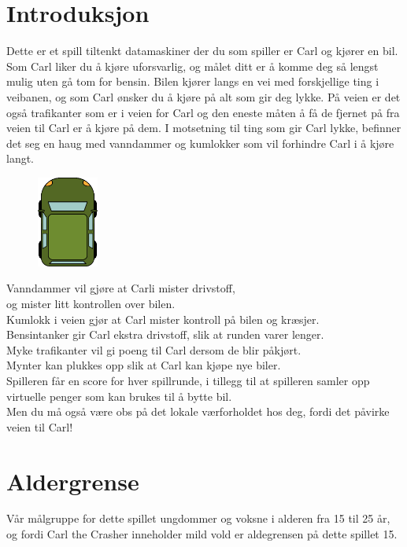 \documentclass[paper=a4]{article}
\begin{document}
\section{Introduksjon}
Dette er et spill tiltenkt datamaskiner der du som spiller er Carl og kjører en bil. 
Som Carl liker du å kjøre uforsvarlig, og målet ditt er å komme deg så lengst mulig uten gå tom for bensin. 
Bilen kjører langs en vei med forskjellige ting i veibanen, og som Carl ønsker du å kjøre på alt som gir deg lykke. 
På veien er det også trafikanter som er i veien for Carl og den eneste måten å få de fjernet på fra veien til Carl er å kjøre på dem.
I motsetning til ting som gir Carl lykke, befinner det seg en haug med vanndammer og kumlokker som vil forhindre Carl i å kjøre langt. 
\begin{figure}
\includegraphics[width=2cm]{images/car.png}
\end{figure} 
Vanndammer vil gjøre at Carli mister drivstoff, \\ og mister litt kontrollen over bilen. \\
Kumlokk i veien gjør at Carl mister kontroll på bilen og kræsjer. \\
Bensintanker gir Carl ekstra drivstoff, slik at runden varer lenger. \\
Myke trafikanter vil gi poeng til Carl dersom de blir påkjørt. \\
Mynter kan plukkes opp slik at Carl kan kjøpe nye biler. \\
Spilleren får en score for hver spillrunde, i tillegg til at spilleren samler opp virtuelle penger som kan brukes til å bytte bil. \\
Men du må også være obs på det lokale værforholdet hos deg, fordi det påvirke veien til Carl! 

\section{Aldergrense}
Vår målgruppe for dette spillet ungdommer og voksne i alderen fra 15 til 25 år, \\ 
og fordi Carl the Crasher inneholder mild vold er aldegrensen på dette spillet 15. 
\newpage
\end{document}
